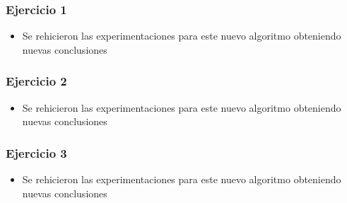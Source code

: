 \subsubsection*{Ejercicio 1}

\begin{itemize}
\item Se rehicieron las experimentaciones para este nuevo algoritmo obteniendo nuevas conclusiones
\end{itemize}

\subsubsection*{Ejercicio 2}

\begin{itemize}
\item Se rehicieron las experimentaciones para este nuevo algoritmo obteniendo nuevas conclusiones
\end{itemize}

\subsubsection*{Ejercicio 3}

\begin{itemize}
\item Se rehicieron las experimentaciones para este nuevo algoritmo obteniendo nuevas conclusiones
\end{itemize}